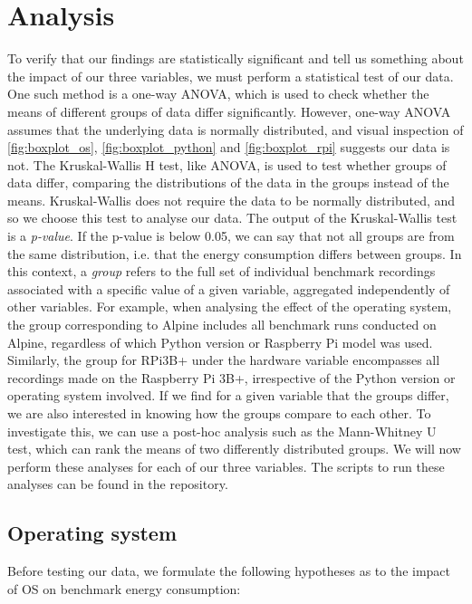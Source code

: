 \section{Analysis}
\label{sec:analysis}

To verify that our findings are statistically significant and tell us something about the impact of our three variables, we must perform a statistical test of our data. One such method is a one-way ANOVA\cite{montgomery2019design}, which is used to check whether the means of different groups of data differ significantly. However, one-way ANOVA assumes that the underlying data is normally distributed, and visual inspection of \autoref{fig:boxplot_os}, \autoref{fig:boxplot_python} and \autoref{fig:boxplot_rpi} suggests our data is not. The Kruskal-Wallis H test\cite{kruskal1952use}, like ANOVA, is used to test whether groups of data differ, comparing the distributions of the data in the groups instead of the means. Kruskal-Wallis does not require the data to be normally distributed, and so we choose this test to analyse our data. The output of the Kruskal-Wallis test is a \textit{p-value}. If the p-value is below 0.05, we can say that not all groups are from the same distribution, i.e. that the energy consumption differs between groups. In this context, a \textit{group} refers to the full set of individual benchmark recordings associated with a specific value of a given variable, aggregated independently of other variables. For example, when analysing the effect of the operating system, the group corresponding to Alpine includes all benchmark runs conducted on Alpine, regardless of which Python version or Raspberry Pi model was used. Similarly, the group for RPi3B+ under the hardware variable encompasses all recordings made on the Raspberry Pi 3B+, irrespective of the Python version or operating system involved. If we find for a given variable that the groups differ, we are also interested in knowing how the groups compare to each other. To investigate this, we can use a post-hoc analysis such as the Mann-Whitney U test\cite{mann1947test}, which can rank the means of two differently distributed groups. We will now perform these analyses for each of our three variables. The scripts to run these analyses can be found in the repository.

\subsection*{Operating system}
Before testing our data, we formulate the following hypotheses as to the impact of OS on benchmark energy consumption:

